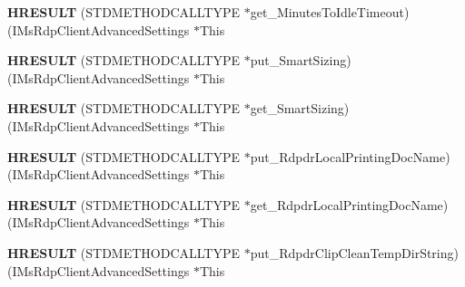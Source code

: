 \begin{DoxyCompactItemize}
\item 
\mbox{\label{struct_i_ms_rdp_client_advanced_settings_vtbl_a6a790aa89808aa61f532d3a501ad8d2a}} 
{\bfseries H\+R\+E\+S\+U\+LT} (S\+T\+D\+M\+E\+T\+H\+O\+D\+C\+A\+L\+L\+T\+Y\+PE $\ast$get\+\_\+\+Minutes\+To\+Idle\+Timeout)(I\+Ms\+Rdp\+Client\+Advanced\+Settings $\ast$This
\item 
\mbox{\label{struct_i_ms_rdp_client_advanced_settings_vtbl_a0359bf41d2a76b0db90d839dfcecd4a9}} 
{\bfseries H\+R\+E\+S\+U\+LT} (S\+T\+D\+M\+E\+T\+H\+O\+D\+C\+A\+L\+L\+T\+Y\+PE $\ast$put\+\_\+\+Smart\+Sizing)(I\+Ms\+Rdp\+Client\+Advanced\+Settings $\ast$This
\item 
\mbox{\label{struct_i_ms_rdp_client_advanced_settings_vtbl_a77fca2806056e6d772302bdc69e2babb}} 
{\bfseries H\+R\+E\+S\+U\+LT} (S\+T\+D\+M\+E\+T\+H\+O\+D\+C\+A\+L\+L\+T\+Y\+PE $\ast$get\+\_\+\+Smart\+Sizing)(I\+Ms\+Rdp\+Client\+Advanced\+Settings $\ast$This
\item 
\mbox{\label{struct_i_ms_rdp_client_advanced_settings_vtbl_a881961e92c71c2e8b68e8dd189472237}} 
{\bfseries H\+R\+E\+S\+U\+LT} (S\+T\+D\+M\+E\+T\+H\+O\+D\+C\+A\+L\+L\+T\+Y\+PE $\ast$put\+\_\+\+Rdpdr\+Local\+Printing\+Doc\+Name)(I\+Ms\+Rdp\+Client\+Advanced\+Settings $\ast$This
\item 
\mbox{\label{struct_i_ms_rdp_client_advanced_settings_vtbl_add466e7e764777a95c35212abdfb76a3}} 
{\bfseries H\+R\+E\+S\+U\+LT} (S\+T\+D\+M\+E\+T\+H\+O\+D\+C\+A\+L\+L\+T\+Y\+PE $\ast$get\+\_\+\+Rdpdr\+Local\+Printing\+Doc\+Name)(I\+Ms\+Rdp\+Client\+Advanced\+Settings $\ast$This
\item 
\mbox{\label{struct_i_ms_rdp_client_advanced_settings_vtbl_adbc134d1f78e378784cf34026dc1cfdf}} 
{\bfseries H\+R\+E\+S\+U\+LT} (S\+T\+D\+M\+E\+T\+H\+O\+D\+C\+A\+L\+L\+T\+Y\+PE $\ast$put\+\_\+\+Rdpdr\+Clip\+Clean\+Temp\+Dir\+String)(I\+Ms\+Rdp\+Client\+Advanced\+Settings $\ast$This
\item 
\mbox{\label{struct_i_ms_rdp_client_advanced_settings_vtbl_adbab57228c2e6b3166db331459f129ff}} 

\end{DoxyCompactItemize}
